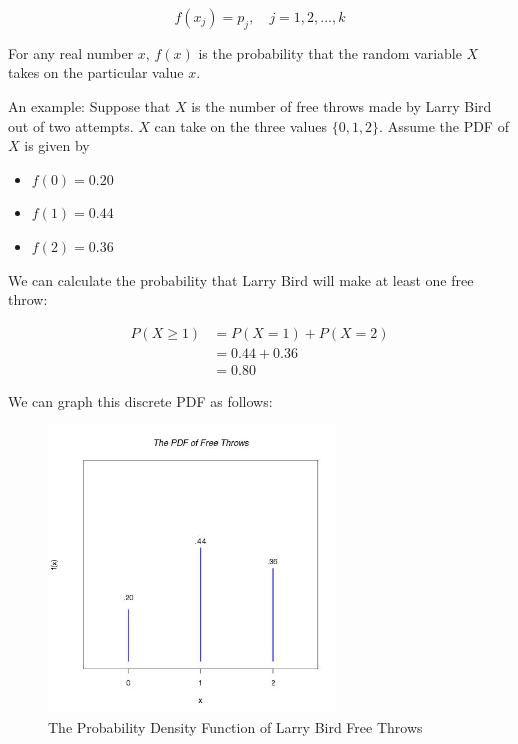 \documentclass[11pt]{article}
\begin{document}
\begin{equation*}
f(x_{j}) = p_{j}, \quad \mbox{$j = 1, 2, \ldots, k$}
\end{equation*}

\vspace{2mm}

For any real number $x$, $f(x)$ is the probability that the random variable $X$ takes on the particular value $x$.

\vspace{2mm}
\newpage
An example: Suppose that $X$ is the number of free throws made by Larry Bird out of two attempts. $X$ can take on 
the three values $\{0, 1, 2\}$. Assume the PDF of $X$ is given by

\begin{itemize}
 \item[] $f(0) = 0.20$
 \item[] $f(1) = 0.44$
 \item[] $f(2) = 0.36$
\end{itemize}

\vspace{2mm}

We can calculate the probability that Larry Bird will make at least one free throw: 

\begin{align*}
P(X \geq 1) &= P(X = 1) + P(X = 2) \\
            &= 0.44 + 0.36 \\
            &= 0.80 
\end{align*}

\vspace{2mm}

We can graph this discrete PDF as follows:

\vspace{2mm}

\begin{figure}[h]
\centering
\includegraphics[width=3in]{images/Larry.jpeg}
\caption{The Probability Density Function of Larry Bird Free Throws}
\end{figure}
\end{document}
